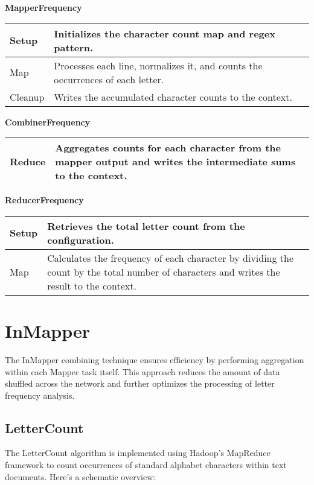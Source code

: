 \textbf{MapperFrequency}
\begin{longtable}{|>{\raggedright\arraybackslash}p{}|>{\raggedright\arraybackslash}p{}|}
    \hline
    Setup &   Initializes the character count map and regex pattern.\\
    \hline
    Map &  Processes each line, normalizes it, and counts the occurrences of each letter.\\
    \hline
    Cleanup & Writes the accumulated character counts to the context.\\
    \hline
\end{longtable}


\textbf{CombinerFrequency}
\begin{longtable}{|>{\raggedright\arraybackslash}p{}|>{\raggedright\arraybackslash}p{}|}
    \hline
    Reduce & Aggregates counts for each character from the mapper output and writes the intermediate sums to the context.\\
    \hline
\end{longtable}

\textbf{ReducerFrequency}
\begin{longtable}{|>{\raggedright\arraybackslash}p{}|>{\raggedright\arraybackslash}p{}|}
    \hline
    Setup & Retrieves the total letter count from the configuration. \\
    \hline
    Map & Calculates the frequency of each character by dividing the count by the total number of characters and writes the result to the context.\\
    \hline
\end{longtable}



\section{InMapper}
The InMapper combining technique ensures efficiency by performing aggregation within each Mapper task itself. This approach reduces the amount of data shuffled across the network and further optimizes the processing of letter frequency analysis.


\subsection{LetterCount}

The LetterCount algorithm is implemented using Hadoop's MapReduce framework to count occurrences of standard alphabet characters within text documents. Here’s a schematic overview:


